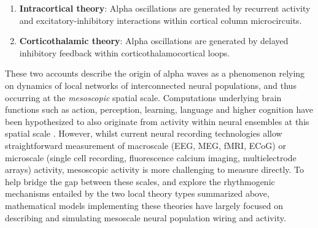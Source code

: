 \documentclass[12pt,twoside]{article}
\begin{document}
\begin{enumerate}

\item   \textbf{Intracortical theory}: Alpha oscillations are generated by recurrent activity and excitatory-inhibitory interactions within cortical column microcircuits.%

\item	\textbf{Corticothalamic theory}: Alpha oscillations are generated by delayed inhibitory feedback within corticothalamocortical loops.   %



\end{enumerate}

These two accounts describe the origin of alpha waves as a phenomenon relying on dynamics of local networks of interconnected neural populations, and thus occurring at the \textit{mesoscopic} spatial scale. Computations underlying brain functions such as action, perception, learning, language and higher cognition have been hypothesized to also originate from activity within neural ensembles at this spatial scale \citep{deco2008dynamic}. However, whilst current neural recording technologies allow straightforward measurement of macroscale (EEG, MEG, fMRI, ECoG) or microscale (single cell recording, fluorescence calcium imaging, multielectrode arrays) activity, mesoscopic activity is more challenging to measure directly. To help bridge the gap between these scales, and explore the rhythmogenic mechanisms entailed by the two local theory types summarized above, mathematical models implementing these theories have largely focused on describing and simulating mesoscale neural population wiring and activity. 
\end{document}
